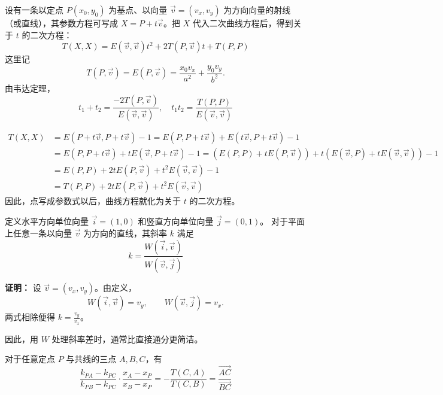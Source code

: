 \begin{conclusion}[直线参数方程]
设有一条以定点 $P(x_0, y_0)$ 为基点、以向量 $\vec{v} = (v_x, v_y)$ 为方向向量的射线（或直线），其参数方程可写成 $X = P + t\vec{v}$。把 $X$ 代入二次曲线方程后，得到关于 $t$ 的二次方程：
$$ T(X,X) = E(\vec{v},\vec{v}) t^2 + 2T(P, \vec{v}) t + T(P,P) $$
这里记
\[
T(P, \vec{v})=E(P, \vec{v}) = \frac{x_0 v_x}{a^2} + \frac{y_0 v_y}{b^2}.
\]
由韦达定理，
\[ t_1 + t_2 = \frac{-2T(P,\vec{v})}{E(\vec{v},\vec{v})}, \quad t_1 t_2 = \frac{T(P,P)}{E(\vec{v},\vec{v})} \]
\end{conclusion}
\vspace{-20pt}
\begin{align*}
T(X,X)& = E(P + t\vec{v}, P + t\vec{v}) - 1 = E(P, P+t\vec{v}) + E(t\vec{v}, P+t\vec{v})-1\\
&= E(P, P+t\vec{v}) +t E(\vec{v}, P+t\vec{v})-1= (E(P,P) + tE(P,\vec{v})) + t(E(\vec{v},P) + tE(\vec{v},\vec{v}))-1 \\
&=E(P,P) + 2tE(P,\vec{v}) + t^2E(\vec{v},\vec{v})-1\\
&=T(P,P)+2tE(P,\vec{v}) + t^2E(\vec{v},\vec{v})
\end{align*}
因此，点写成参数式以后，曲线方程就化为关于 $t$ 的二次方程。

\begin{conclusion}[斜率与外积的关系]
定义水平方向单位向量 $\vec{i} = (1, 0)$ 和竖直方向单位向量 $\vec{j} = (0, 1)$。
对于平面上任意一条以向量 $\vec{v}$ 为方向的直线，其斜率 $k$ 满足
$$ k = \frac{W(\vec{i}, \vec{v})}{W(\vec{v}, \vec{j})} $$
\end{conclusion}
\textbf{证明：}
设 $\vec{v} = (v_x, v_y)$。由定义，
\[
W(\vec{i}, \vec{v}) = v_y,\qquad W(\vec{v}, \vec{j}) = v_x.
\]
两式相除便得 $k = \frac{v_y}{v_x}$。
\begin{remark}
因此，用 $W$ 处理斜率差时，通常比直接通分更简洁。
\end{remark}

\begin{conclusion}[调和线束中的一个关系式]
对于任意定点 $P$ 与共线的三点 $A, B, C$，有
$$ \frac{k_{PA}-k_{PC}}{k_{PB}-k_{PC}} \cdot \frac{x_A-x_P}{x_B-x_P} = -\frac{T(C,A)}{T(C,B)} = \frac{\overrightarrow{AC}}{\overrightarrow{BC}} $$
\end{conclusion}

